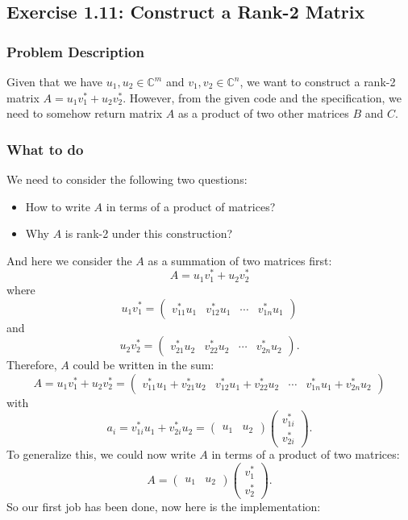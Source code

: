 \subsection*{Exercise 1.11: Construct a Rank-2 Matrix}%
\subsubsection*{Problem Description}
Given that we have $u_1, u_2 \in \mathbb{C}^{m}$ and $v_1, v_2 \in \mathbb{C}^{n}$, we want to construct a rank-2 matrix $A = u_1v_1^{*} + u_2v_2^{*}$. However, from the given code and the specification, we need to somehow return matrix  $A$ as a product of two other matrices $B$ and $C$.
\subsubsection*{What to do}
We need to consider the following two questions:
\begin{itemize}
  \item How to write $A$ in terms of a product of matrices?
  \item Why $A$ is rank-2 under this construction?
\end{itemize}
And here we consider the $A$ as a summation of two matrices first:
\[
A = u_1v_1^{*} + u_2v_2^{*}
\]
where
\[
  u_1v_1^{*} = \begin{pmatrix} v_{11}^{*}u_1 & v_{12}^{*}u_1 & \cdots & v_{1n}^{*}u_1 \end{pmatrix} 
\]
and
\[
  u_2v_2^{*} = \begin{pmatrix} v_{21}^{*}u_2 & v_{22}^{*}u_2 & \cdots & v_{2n}^{*}u_2 \end{pmatrix} 
.\] 
Therefore, $A$ could be written in the sum:
\[
  A = u_1v_1^{*} + u_2v_2^{*} = \begin{pmatrix} v_{11}^{*}u_1 + v_{21}^{*}u_2 & v_{12}^{*}u_1 + v_{22}^{*}u_2 & \cdots & v_{1n}^{*}u_1 + v_{2n}^{*}u_2 \end{pmatrix} 
\]
with
\[
  a_{i} = v_{1i}^{*}u_1 + v_{2i}^{*}u_2 = \begin{pmatrix} u_1 & u_2 \end{pmatrix} \begin{pmatrix} v_{1i}^{*}\\ v_{2i}^{*} \end{pmatrix}
.\] 
To generalize this, we could now write $A$ in terms of a product of two matrices:
\[
A = \begin{pmatrix} u_1 & u_2 \end{pmatrix} \begin{pmatrix} v_{1}^{*}\\ v_{2}^{*} \end{pmatrix}  
.\]
So our first job has been done, now here is the implementation:

